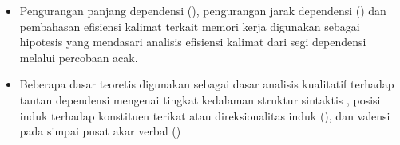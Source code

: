 \begin{itemize}
	\begin{itemize}
		\item Pengurangan panjang dependensi (\citealp{temperley2007minimization, temperley2008dependency, gildea2010grammars}), pengurangan jarak dependensi (\citealp{liu2008dependency, liu2017dependency}) dan pembahasan efisiensi kalimat terkait memori kerja \citep{hawkins2004efficiency} digunakan sebagai hipotesis yang mendasari analisis efisiensi kalimat dari segi dependensi melalui percobaan acak.
		\item Beberapa dasar teoretis digunakan sebagai dasar analisis kualitatif terhadap tautan dependensi mengenai tingkat kedalaman struktur sintaktis \citep{yngve1960model}, posisi induk terhadap konstituen terikat atau direksionalitas induk (\citealp{dryer1992greenbergian, temperley2008dependency}), dan valensi pada simpai pusat akar verbal (\citealp{hudson2007language, welke2002deutsche})
	\end{itemize}
\end{itemize}
	

